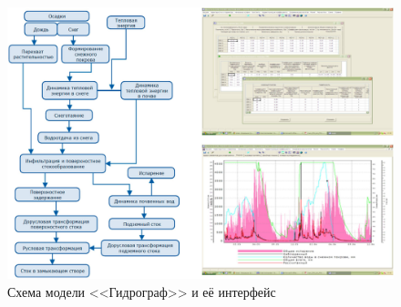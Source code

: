 \begin{figure}[H]
  \begin{center}
    \includegraphics[width=1\textwidth]{authors/nesterova-1-fig-1.jpg}
  \end{center}
  \caption{Схема модели <<Гидрограф>> и её интерфейс}
  \label{fig:nesterova-1-fig-1}
\end{figure}
